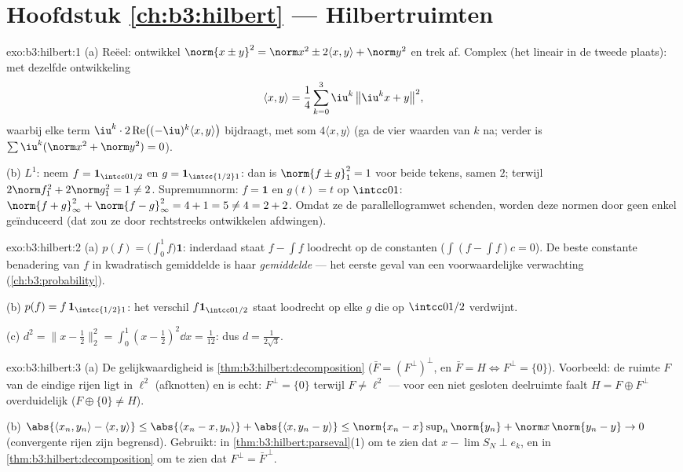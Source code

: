 \section*{Hoofdstuk \ref{ch:b3:hilbert} --- Hilbertruimten}

\begin{solution}{exo:b3:hilbert:1}
(a) Reëel: ontwikkel $\norm{x \pm y}^2 = \norm x^2 \pm 2\langle
x,y\rangle + \norm y^2$ en trek af. Complex (het 
lineair in de tweede plaats): met dezelfde ontwikkeling
\[
\langle x, y\rangle = \frac14\sum_{k=0}^{3}
\iu^k\,\bigl\|\iu^kx + y\bigr\|^2,
\]
waarbij elke term $\iu^k\cdot2\operatorname{Re}\bigl(
(-\iu)^k\langle x,y\rangle\bigr)$ bijdraagt, met som $4\langle
x,y\rangle$ (ga de vier waarden van $k$ na; verder is
$\sum\iu^k (\norm x^2 + \norm y^2) = 0$).

(b) $L^1$: neem $f = \mathbf 1_{\intcc0{1/2}}$ en $g = \mathbf
1_{\intcc{1/2}1}$: dan is $\norm{f\pm g}_1^2 = 1$ voor beide
tekens, samen $2$; terwijl $2\norm f_1^2 + 2\norm g_1^2 = 1 \neq
2$. Supremumnorm: $f = \mathbf 1$ en $g(t) = t$ op $\intcc01$:
$\norm{f + g}_\infty^2 + \norm{f-g}_\infty^2 = 4 + 1 = 5 \neq 4 =
2 + 2$. Omdat ze de parallellogramwet schenden, worden deze
normen door geen enkel  geïnduceerd (dat zou ze
door rechtstreeks ontwikkelen afdwingen).
\end{solution}

\begin{solution}{exo:b3:hilbert:2}
(a) $p(f) = \bigl(\int_0^1f\bigr)\mathbf 1$: inderdaad staat $f -
\int f$ loodrecht op de constanten ($\int(f - \int f)c = 0$). De
beste constante benadering van $f$ in kwadratisch gemiddelde is
haar \emph{gemiddelde} --- het eerste geval van een voorwaardelijke
verwachting (\cref{ch:b3:probability}).

(b) $p(f) = f\,\mathbf 1_{\intcc{1/2}1}$: het verschil $f\mathbf
1_{\intcc0{1/2}}$ staat loodrecht op elke $g$ die op
$\intcc0{1/2}$ verdwijnt.

(c) $d^2 = \bigl\|x - \tfrac12\bigr\|_2^2 = \int_0^1(x -
\tfrac12)^2\dd x = \tfrac1{12}$: dus $d = \frac1{2\sqrt3}$.
\end{solution}

\begin{solution}{exo:b3:hilbert:3}
(a) De gelijkwaardigheid is
\cref{thm:b3:hilbert:decomposition} ($\bar F = (F^\perp)^\perp$,
en $\bar F = H \iff F^\perp = \{0\}$). Voorbeeld: de ruimte $F$
van de eindige rijen ligt  in $\ell^2$ (afknotten) en is
echt: $F^\perp = \{0\}$ terwijl $F \neq \ell^2$ --- voor een niet
gesloten deelruimte faalt $H = F \oplus F^\perp$ overduidelijk
($F \oplus \{0\} \neq H$).

(b) $\abs{\langle x_n, y_n\rangle - \langle x, y\rangle} \leq
\abs{\langle x_n - x, y_n\rangle} + \abs{\langle x, y_n -
y\rangle} \leq \norm{x_n - x}\sup_n\norm{y_n} + \norm
x\,\norm{y_n - y} \to 0$ (convergente rijen zijn begrensd).
Gebruikt: in \cref{thm:b3:hilbert:parseval}(1) om te zien dat $x
- \lim S_N \perp e_k$, en in
\cref{thm:b3:hilbert:decomposition} om te zien dat $F^\perp =
\bar F^{\,\perp}$.
\end{solution}

